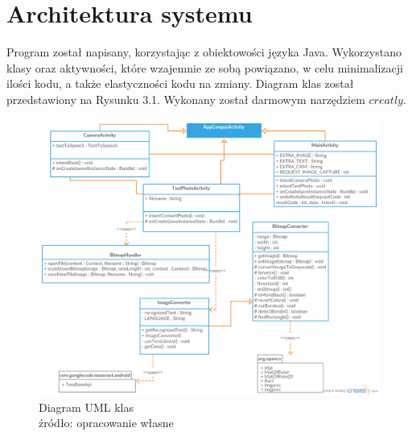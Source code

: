 \documentclass[eng,oneside]{mgr}
\begin{document}
\chapter{Architektura systemu}
Program został napisany, korzystając z obiektowości języka Java. Wykorzystano klasy oraz aktywności, które wzajemnie ze sobą powiązano, w celu minimalizacji ilości kodu, a także elastyczności kodu na zmiany. Diagram klas został przedstawiony na Rysunku 3.1. Wykonany został darmowym narzędziem $creatly$.
\begin{figure}[htbp]
\centering
\includegraphics[scale=0.49]{diagramuml.png}
\caption{Diagram UML klas
\\ 
źródło: opracowanie własne}
\end{figure}
\end{document}

